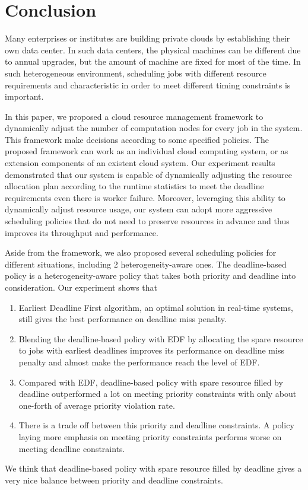 \chapter{Conclusion}\label{chap:conclusion}

Many enterprises or institutes are building private clouds by
establishing their own data center.
In such data centers, the physical machines can be different due to 
annual upgrades,  but the amount of machine are fixed for most of the 
time.
In such heterogeneous environment, scheduling jobs with different 
resource requirements and characteristic in order to meet different 
timing constraints is important.

In this paper, we proposed a cloud resource management framework to
dynamically adjust the number of computation nodes for every job in the
system.
This framework make decisions according to some specified policies.
The proposed framework can work as an individual cloud computing system,
or as extension components of an existent cloud system.
Our experiment results demonstrated that our system is capable of
dynamically adjusting the resource allocation plan according to the
runtime statistics to meet the deadline requirements even there is
worker failure.
Moreover, leveraging this ability to dynamically adjust resource usage,
our system can adopt more aggressive scheduling policies that do not
need to preserve resources in advance and thus improves its throughput
and performance.

Aside from the framework, we also proposed several scheduling policies
for different situations, including 2 heterogeneity-aware ones.
The deadline-based policy is a heterogeneity-aware policy that takes
both priority and deadline into consideration.
Our experiment shows that
\begin{enumerate}
  \item Earliest Deadline First algorithm, an optimal solution in
    real-time systems, still gives the best performance on deadline miss
    penalty.
  \item Blending the deadline-based policy with EDF by allocating the
    spare resource to jobs with earliest deadlines improves its
    performance on deadline miss penalty and almost make the performance
    reach the level of EDF.
  \item Compared with EDF, deadline-based policy with spare resource
    filled by deadline outperformed a lot on meeting priority
    constraints with only about one-forth of average priority violation
    rate.
  \item There is a trade off between this priority and deadline
    constraints.  A policy laying more emphasis on meeting priority
    constraints performs worse on meeting deadline constraints.
\end{enumerate}
We think that deadline-based policy with spare resource filled by
deadline gives a very nice balance between priority and deadline constraints.

